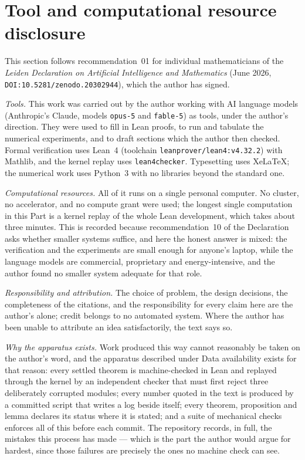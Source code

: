 \documentclass[11pt,a4paper]{article}
\theoremstyle{plain}
\theoremstyle{definition}
\theoremstyle{remark}
\begin{document}
\section*{Tool and computational resource disclosure}
This section follows recommendation~01 for individual mathematicians of the
\emph{Leiden Declaration on Artificial Intelligence and Mathematics} (June 2026,
\texttt{DOI:10.5281/zenodo.20302944}), which the author has signed.

\emph{Tools.} This work was carried out by the author working with AI language models
(Anthropic's Claude, models \texttt{opus-5} and \texttt{fable-5}) as tools, under the
author's direction. They were used to fill in Lean proofs, to run and tabulate the numerical
experiments, and to draft sections which the author then checked. Formal verification uses
Lean~4 (toolchain \texttt{leanprover/lean4:v4.32.2}) with Mathlib, and the kernel replay uses
\texttt{lean4checker}. Typesetting uses Xe\LaTeX{}; the numerical work uses Python~3 with no
libraries beyond the standard one.

\emph{Computational resources.} All of it runs on a single personal computer. No cluster, no
accelerator, and no compute grant were used; the longest single computation in this Part is a
kernel replay of the whole Lean development, which takes about three minutes. This is recorded
because recommendation~10 of the Declaration asks whether smaller systems suffice, and here the
honest answer is mixed: the verification and the experiments are small enough for anyone's
laptop, while the language models are commercial, proprietary and energy-intensive, and the
author found no smaller system adequate for that role.

\emph{Responsibility and attribution.} The choice of problem, the design decisions, the
completeness of the citations, and the responsibility for every claim here are the author's
alone; credit belongs to no automated system. Where the author has been unable to attribute an
idea satisfactorily, the text says so.

\emph{Why the apparatus exists.} Work produced this way cannot reasonably be taken on the
author's word, and the apparatus described under Data availability exists for that reason:
every settled theorem is machine-checked in Lean and replayed through the kernel by an
independent checker that must first reject three deliberately corrupted modules; every number
quoted in the text is produced by a committed script that writes a log beside itself; every
theorem, proposition and lemma declares its status where it is stated; and a suite of
mechanical checks enforces all of this before each commit. The repository records, in full, the
mistakes this process has made --- which is the part the author would argue for hardest, since
those failures are precisely the ones no machine check can see.
\end{document}
